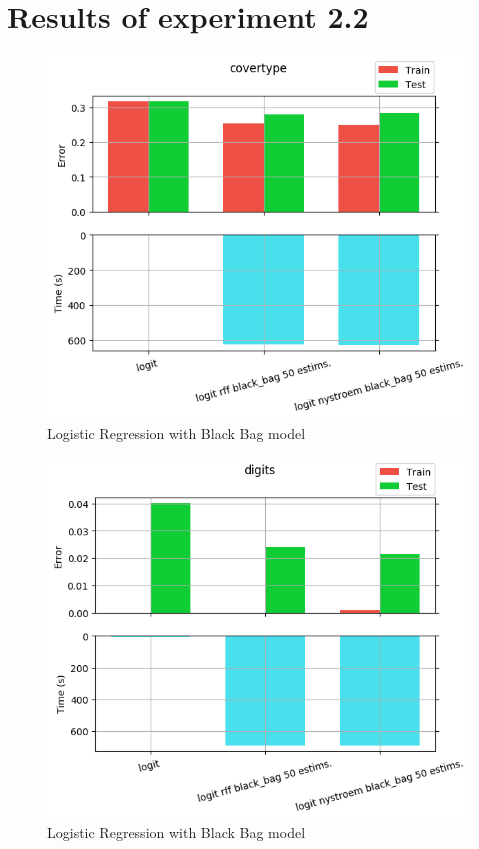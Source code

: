 
\chapter{Results of experiment 2.2} %

\label{Appendix2-2} %

\begin{figure}[th]
\centering
\includegraphics[scale=\imgscale]{Figures/2_2/covertype}
\decoRule
\caption[2.2 covertype]{Logistic Regression with Black Bag model}
\label{fig:2_2_covertype}
\end{figure}

\begin{figure}[th]
\centering
\includegraphics[scale=\imgscale]{Figures/2_2/digits}
\decoRule
\caption[2.2 digits]{Logistic Regression with Black Bag model}
\label{fig:2_2_digits}
\end{figure}

